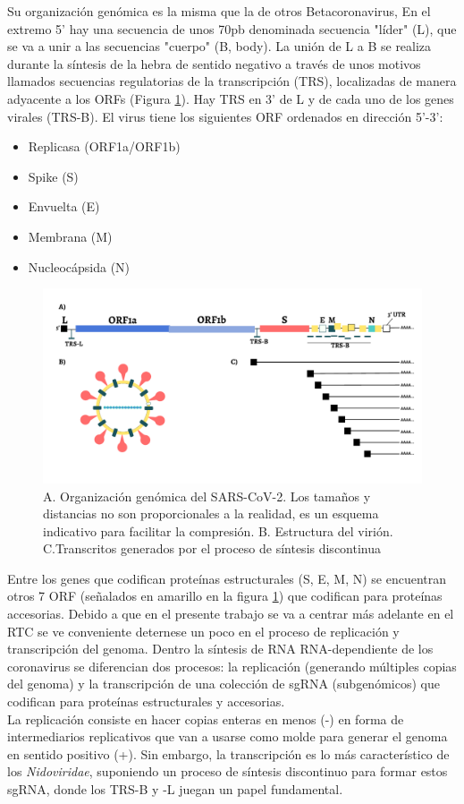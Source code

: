 \documentclass[a4paper,11pt]{report}
\begin{document}
  Su organización genómica es la misma que la de otros Betacoronavirus, En el extremo 5' hay una secuencia de unos 70pb denominada secuencia "líder" (L), que se va a unir a las secuencias "cuerpo" (B, body). La unión de L a B se realiza durante la síntesis de la hebra de sentido negativo a través de unos motivos llamados secuencias regulatorias de la transcripción (TRS), localizadas de manera adyacente a los ORFs (Figura \ref{genoma}). Hay TRS en 3' de L y de cada uno de los genes virales (TRS-B). El virus tiene los siguientes ORF ordenados en dirección 5'-3':
 \begin{itemize}
 	\item Replicasa (ORF1a/ORF1b)
 	\item Spike (S)
 	\item Envuelta (E)
 	\item Membrana (M)
 	\item Nucleocápsida (N) 
 \end{itemize}
 
 \begin{figure}[t]
 	\centering
 	\includegraphics[width=\textwidth]{Figuras/Figura1}
 	\caption{A. Organización genómica del SARS-CoV-2. Los tamaños y distancias no son proporcionales a la realidad, es un esquema indicativo para facilitar la compresión. B. Estructura del virión. C.Transcritos generados por el proceso de síntesis discontinua}
 	\label{genoma}
 	
 \end{figure}
Entre los genes que codifican proteínas estructurales (S, E, M, N) se encuentran otros 7 ORF (señalados en amarillo en la figura \ref{genoma}) que codifican para proteínas accesorias.
 Debido a que en el presente trabajo se va a centrar más adelante en el RTC se ve conveniente deternese un poco en el proceso de replicación y transcripción del genoma. Dentro la síntesis de RNA RNA-dependiente de los coronavirus se diferencian dos procesos: la replicación (generando múltiples copias del genoma) y la transcripción de una colección de sgRNA (subgenómicos) que codifican para proteínas estructurales y accesorias. \\
 La replicación consiste en hacer copias enteras en menos (-) en forma de intermediarios replicativos que van a usarse como molde para generar el genoma en sentido positivo (+). Sin embargo, la transcripción es lo más característico de los \textit{Nidoviridae}, suponiendo un proceso de síntesis discontinuo para formar estos sgRNA, donde los TRS-B y -L juegan un papel fundamental.\cite{Kim2020}\\
 
\end{document}

